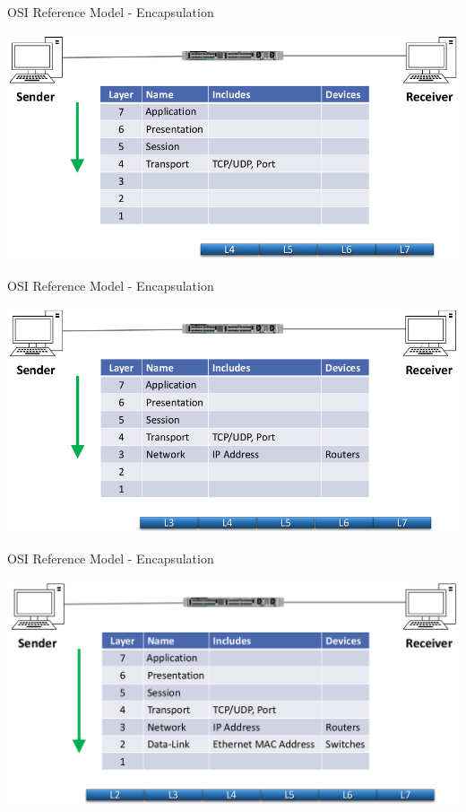 \documentclass[pdflatex,compress,mathserif]{beamer}
\begin{document}
\begin{frame}{OSI Reference Model - Encapsulation}
	\begin{center}
		\includegraphics[width=\linewidth]{img/img05}
	\end{center}
\end{frame}

\begin{frame}{OSI Reference Model - Encapsulation}
	\begin{center}
		\includegraphics[width=\linewidth]{img/img06}
	\end{center}
\end{frame}

\begin{frame}{OSI Reference Model - Encapsulation}
	\begin{center}
		\includegraphics[width=\linewidth]{img/img07}
	\end{center}
\end{frame}
\end{document}

